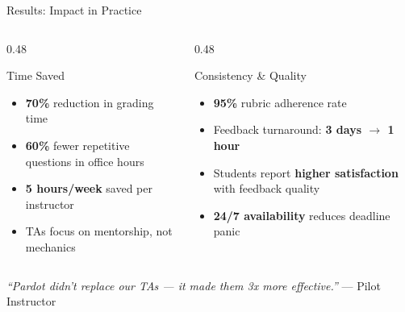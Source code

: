 \documentclass[aspectratio=169]{beamer}
\begin{document}
\begin{frame}{Results: Impact in Practice}
\begin{columns}[T]
\begin{column}{0.48\textwidth}
\begin{block}{Time Saved}
\begin{itemize}
  \item \textbf{70\%} reduction in grading time
  \item \textbf{60\%} fewer repetitive questions in office hours
  \item \textbf{5 hours/week} saved per instructor
  \item TAs focus on mentorship, not mechanics
\end{itemize}
\end{block}
\end{column}
\begin{column}{0.48\textwidth}
\begin{block}{Consistency \& Quality}
\begin{itemize}
  \item \textbf{95\%} rubric adherence rate
  \item Feedback turnaround: \textbf{3 days $\rightarrow$ 1 hour}
  \item Students report \textbf{higher satisfaction} with feedback quality
  \item \textbf{24/7 availability} reduces deadline panic
\end{itemize}
\end{block}
\end{column}
\end{columns}
\vfill
\begin{center}
\textit{``Pardot didn't replace our TAs --- it made them 3x more effective.''} --- Pilot Instructor
\end{center}
\end{frame}
\end{document}
